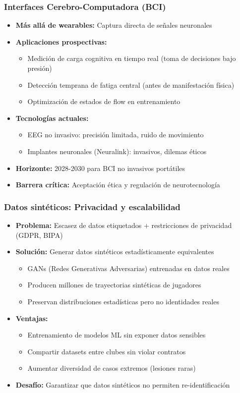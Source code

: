 \documentclass[aspectratio=169]{beamer}
\begin{document}
\begin{frame}\frametitle{Interfaces Cerebro-Computadora (BCI)}
\begin{itemize}
    \item \textbf{Más allá de wearables:} Captura directa de señales neuronales
    \item \textbf{Aplicaciones prospectivas:}
    \begin{itemize}
        \item Medición de carga cognitiva en tiempo real (toma de decisiones bajo presión)
        \item Detección temprana de fatiga central (antes de manifestación física)
        \item Optimización de estados de flow en entrenamiento
    \end{itemize}
    \item \textbf{Tecnologías actuales:}
    \begin{itemize}
        \item EEG no invasivo: precisión limitada, ruido de movimiento
        \item Implantes neuronales (Neuralink): invasivos, dilemas éticos
    \end{itemize}
    \item \textbf{Horizonte:} 2028-2030 para BCI no invasivos portátiles
    \item \textbf{Barrera crítica:} Aceptación ética y regulación de neurotecnología
\end{itemize}
\end{frame}

\begin{frame}\frametitle{Datos sintéticos: Privacidad y escalabilidad}
\begin{itemize}
    \item \textbf{Problema:} Escasez de datos etiquetados $+$ restricciones de privacidad (GDPR, BIPA)
    \item \textbf{Solución:} Generar datos sintéticos estadísticamente equivalentes
    \begin{itemize}
        \item GANs (Redes Generativas Adversarias) entrenadas en datos reales
        \item Producen millones de trayectorias sintéticas de jugadores
        \item Preservan distribuciones estadísticas pero no identidades reales
    \end{itemize}
    \item \textbf{Ventajas:}
    \begin{itemize}
        \item Entrenamiento de modelos ML sin exponer datos sensibles
        \item Compartir datasets entre clubes sin violar contratos
        \item Aumentar diversidad de casos extremos (lesiones raras)
    \end{itemize}
    \item \textbf{Desafío:} Garantizar que datos sintéticos no permiten re-identificación
\end{itemize}
\end{frame}
\end{document}
